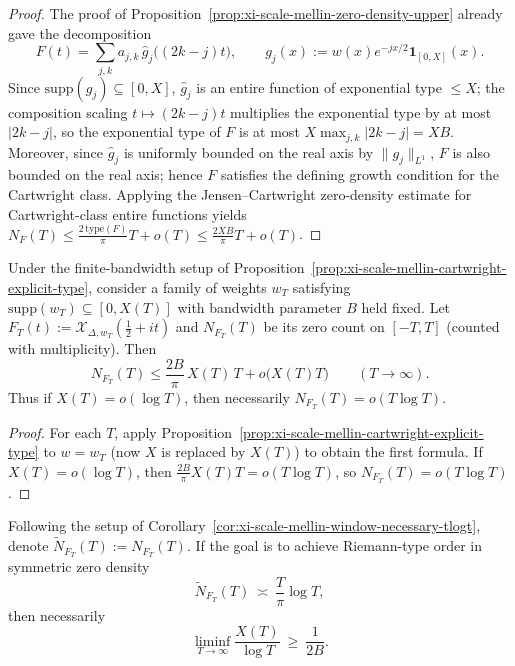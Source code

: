 \begin{proof}
The proof of Proposition~\ref{prop:xi-scale-mellin-zero-density-upper} already gave the decomposition
\[
F(t)=\sum_{j,k}a_{j,k}\,\widehat g_j\bigl((2k-j)t\bigr),
\qquad
g_j(x):=w(x)e^{-jx/2}\mathbf 1_{[0,X]}(x).
\]
Since \(\mathrm{supp}(g_j)\subseteq[0,X]\), \(\widehat g_j\) is an entire function of exponential type \(\le X\); the composition scaling \(t\mapsto (2k-j)t\) multiplies the exponential type by at most \(|2k-j|\), so the exponential type of \(F\) is at most \(X\max_{j,k}|2k-j|=XB\).
Moreover, since \(\widehat g_j\) is uniformly bounded on the real axis by \(\|g_j\|_{L^1}\), \(F\) is also bounded on the real axis;
hence \(F\) satisfies the defining growth condition for the Cartwright class.
Applying the Jensen--Cartwright zero-density estimate for Cartwright-class entire functions yields
\(
N_F(T)\le \frac{2\,\mathrm{type}(F)}{\pi}T+o(T)\le \frac{2XB}{\pi}T+o(T)
\).
\end{proof}

\begin{corollary}\label{cor:xi-scale-mellin-window-necessary-tlogt}
Under the finite-bandwidth setup of Proposition~\ref{prop:xi-scale-mellin-cartwright-explicit-type}, consider a family of weights \(w_T\) satisfying
\(
\mathrm{supp}(w_T)\subseteq[0,X(T)]
\)
with bandwidth parameter \(B\) held fixed.
Let
\(
F_T(t):=\mathcal X_{\Delta,w_T}(\tfrac12+it)
\)
and \(N_{F_T}(T)\) be its zero count on \([-T,T]\) (counted with multiplicity).
Then
\[
N_{F_T}(T)\le \frac{2B}{\pi}\,X(T)\,T+o\!\bigl(X(T)T\bigr)\qquad(T\to\infty).
\]
Thus if \(X(T)=o(\log T)\), then necessarily \(N_{F_T}(T)=o(T\log T)\).
\end{corollary}

\begin{proof}
For each \(T\), apply Proposition~\ref{prop:xi-scale-mellin-cartwright-explicit-type} to \(w=w_T\) (now \(X\) is replaced by \(X(T)\)) to obtain the first formula.
If \(X(T)=o(\log T)\), then \(\frac{2B}{\pi}X(T)T=o(T\log T)\), so \(N_{F_T}(T)=o(T\log T)\).
\end{proof}

\begin{corollary}\label{cor:xi-scale-mellin-window-width-lower-bound-1over2B}
Following the setup of Corollary~\ref{cor:xi-scale-mellin-window-necessary-tlogt}, denote \(\widetilde N_{F_T}(T):=N_{F_T}(T)\).
If the goal is to achieve Riemann-type order in symmetric zero density
\[
\widetilde N_{F_T}(T)\ \asymp\ \frac{T}{\pi}\log T,
\]
then necessarily
\[
\liminf_{T\to\infty}\frac{X(T)}{\log T}\ \ge\ \frac{1}{2B}.
\]
\end{corollary}

